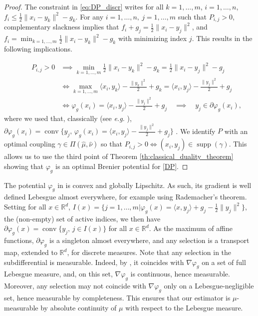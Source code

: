 \documentclass[11pt]{article}
\DeclareMathOperator{\supp}{supp}
\DeclareMathOperator{\conv}{conv}
\newcommand{\R}{\mathbb R}
\newcommand{\1}{\mathbbm{1}}
\numberwithin{equation}{section}
\begin{document}
\begin{proof}
    The constraint in \eqref{eq:DP_discr} writes for all $k=1,\ldots,m$, $i = 1,\ldots, n$, $f_i\leq \frac{1}{2}\|x_i-y_k\|^2-g_k$. 
    For any $i=1,\ldots,n,\:j=1,\ldots,m$ such that $P_{i,j}>0$, complementary slackness \cite[Proposition 3.2]{peyre2019computational} implies that $ f_i+g_j=\frac{1}{2}\|x_i-y_j\|^2$, and $f_i=\min_{k=1,\ldots,m}\frac{1}{2}\|x_i-y_k\|^2-g_k$ with minimizing index $j$. This results in the following implications.
    
    \begin{align*}
        \qquad P_{i,j}>0&\implies\min_{k=1,\ldots,m}\frac{1}{2}\|x_i-y_k\|^2-g_k=\frac{1}{2}\|x_i-y_j\|^2-g_j\\
        &\iff \max_{k=1,\ldots,m} \langle x_i,y_k\rangle-\frac{\|y_k\|^2}{2}+g_k=\langle x_i,y_j\rangle-\frac{\|y_j\|^2}{2}+g_j\\
        &\iff \varphi_g(x_i)=\langle x_i,y_j \rangle-\frac{\|y_j\|^2}{2}+g_j\quad\implies\quad y_j\in \partial \varphi_g(x_i),
    \end{align*}
    where we used that, classically (see \textit{e.g.} \cite[Theorem 23.9]{rockafellar1970convex}), $\partial \varphi_g(x_i) = \conv \{y_j,\, \varphi_g(x_i)=\langle x_i,y_j \rangle-\frac{\|y_j\|^2}{2}+g_j\}$ .
    We identify $P$ with an optimal coupling $\gamma\in\Pi(\hat{\mu},\hat{\nu})$ so that $P_{i,j}>0 \iff (x_i,y_j)\in \supp (\gamma)$. This allows us to use the third point of Theorem \ref{th:classical_duality_theorem} showing that $\varphi_g$ is  an optimal Brenier potential for \eqref{DP}. 
\end{proof}
The potential $\varphi_g$ in  is convex and globally Lipschitz. As such, its gradient is well defined Lebesgue almost everywhere, for example using Rademacher's theorem. 
Setting for all $x \in \R^d$, $I(x) = \{j = 1,\ldots, m| \varphi_g(x) = \langle x,y_j \rangle+g_j-\frac{1}{2}\|y_j\|^2\}$, the (non-empty) set of active indices, we then have $\partial \varphi_g(x) = \conv\{y_j,\, j \in I(x)\}$ for all $x \in \R^d$.
As the maximum of affine functions, $\partial \varphi_g$ is a singleton almost everywhere, and  any selection is a transport map, extended to $\R^d$, for discrete measures. Note that any selection in the subdifferential is measurable. Indeed, by \cite[Theorem 25.5]{rockafellar1970convex}, it coincides  with $\nabla \varphi_g$ on a set of full Lebesgue measure, and, on this set, $\nabla \varphi_g$ is continuous, hence measurable.
Moreover, any selection may not coincide with $\nabla\varphi_g$ only on a Lebesgue-negligible set, hence measurable by completeness. This ensures that our estimator is $\mu$-measurable by absolute continuity of $\mu$ with respect to the Lebesgue measure.
\end{document}
